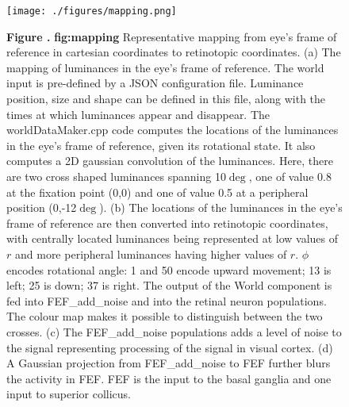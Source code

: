 \documentclass{frontiersSCNS}
\begin{document}
\begin{figure}[htb!]
\begin{center}
\texttt{[image: ./figures/mapping.png]}
\end{center}
\textbf{\label{fig:mapping} Figure .}
{ \textbf{fig:mapping} Representative mapping from eye's frame of
reference in cartesian coordinates to retinotopic coordinates. (a) The
mapping of luminances in the eye's frame of reference. The world input
is pre-defined by a JSON configuration file. Luminance position, size
and shape can be defined in this file, along with the times at which
luminances appear and disappear. The worldDataMaker.cpp code computes
the locations of the luminances in the eye's frame of reference, given
its rotational state. It also computes a 2D gaussian convolution of
the luminances. Here, there are two cross shaped luminances spanning
10$\deg$, one of value 0.8 at the fixation point (0,0) and one of
value 0.5 at a peripheral position (0,-12$\deg$). (b) The locations of
the luminances in the eye's frame of reference are then converted into
retinotopic coordinates, with centrally located luminances being
represented at low values of $r$ and more peripheral luminances having
higher values of $r$. $\phi$ encodes rotational angle: 1 and 50 encode
upward movement; 13 is left; 25 is down; 37 is right. The output of
the World component is fed into FEF\_add\_noise and into the retinal
neuron populations. The colour map makes it possible to distinguish
between the two crosses. (c) The FEF\_add\_noise populations adds a level
of noise to the signal representing processing of the signal in visual
cortex. (d) A Gaussian projection from FEF\_add\_noise to FEF further
blurs the activity in FEF. FEF is the input to the basal ganglia and
one input to superior collicus.}
\end{figure}
\end{document}
